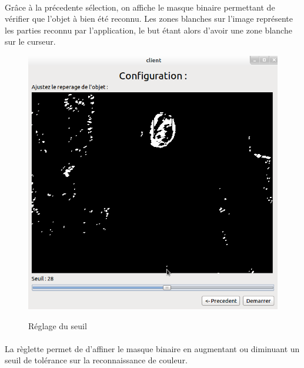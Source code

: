 \documentclass{report}
\begin{document}
				\paragraph{}
				Grâce à la précedente sélection, on affiche le masque binaire permettant de vérifier que l'objet à bien été reconnu. Les zones blanches sur l'image représente les parties reconnu par l'application, le but étant alors d'avoir une zone blanche sur le curseur.
				\begin{figure}[!h]
						\centering
						\includegraphics[scale=0.35]{../images/Capture2.png}\\
						\caption{Réglage du seuil}
						\label{Réglage du seuil}
				\end{figure}
				\paragraph{}
				La règlette permet de d'affiner le masque binaire en augmentant ou diminuant un seuil de tolérance sur la reconnaissance de couleur.
\end{document}

